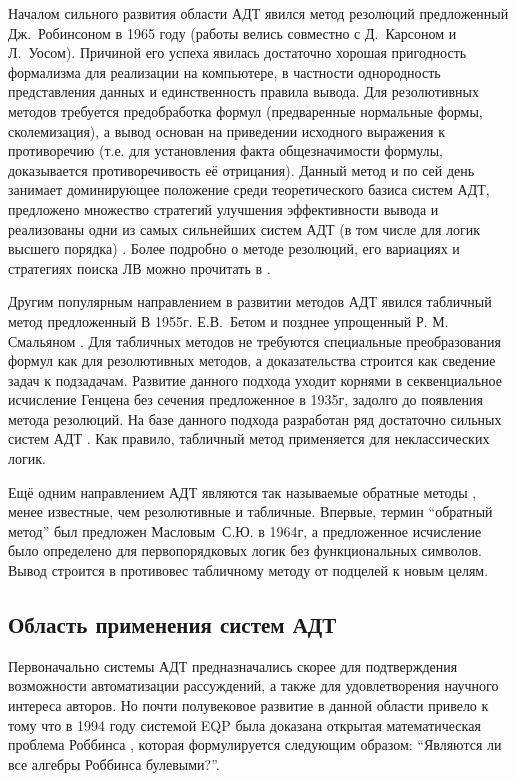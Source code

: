 Началом сильного развития области АДТ явился метод резолюций \cite{Robinson_1965} предложенный Дж.~Робинсоном в 1965 году (работы велись совместно с Д.~Карсоном и Л.~Уосом). Причиной его успеха явилась достаточно хорошая пригодность формализма для реализации на компьютере, в частности однородность представления данных и единственность правила вывода. Для резолютивных методов требуется предобработка формул (предваренные нормальные формы, сколемизация), а вывод основан на приведении исходного выражения к противоречию (т.е. для установления факта общезначимости формулы, доказывается противоречивость её отрицания). Данный метод и по сей день занимает доминирующее положение среди теоретического базиса систем АДТ, предложено множество стратегий улучшения эффективности вывода и реализованы одни из самых сильнейших систем АДТ (в том числе для логик высшего порядка) \cite{otter, vprover, eprover, iprover, leoprover}. Более подробно о методе резолюций, его вариациях и стратегиях поиска ЛВ можно прочитать в \cite{HAR, ChenLi}.

Другим популярным направлением в развитии методов АДТ явился табличный метод \cite{tableau2} предложенный В 1955г. Е.В.~Бетом \cite{Beth1955} и позднее упрощенный Р. М. Смальяном \cite{Smullyan1995}. Для табличных методов не требуются специальные преобразования формул как для резолютивных методов, а доказательства строится как сведение задач к подзадачам.  Развитие данного подхода уходит корнями в секвенциальное исчисление Генцена без сечения \cite{gentzen1935} предложенное в 1935г, задолго до появления метода резолюций. На базе данного подхода разработан ряд достаточно сильных систем АДТ \cite{isabelle, leancop}. Как правило, табличный метод применяется для неклассических логик.

Ещё одним направлением АДТ являются так называемые обратные методы \cite{inverse}, менее известные, чем резолютивные и табличные. Впервые, термин ``обратный метод'' был предложен Масловым~С.Ю. \cite{Maslov_1964} в 1964г, а предложенное исчисление было определено для первопорядковых логик без функциональных символов. Вывод строится в противовес табличному методу от подцелей к новым целям.


\subsection{Область применения систем АДТ}
Первоначально системы АДТ предназначались скорее для подтверждения возможности автоматизации рассуждений, а также для удовлетворения научного интереса авторов. Но почти полувековое развитие в данной области привело к тому что в 1994 году системой EQP была доказана открытая математическая проблема Роббинса \cite{McCuneRob}, которая формулируется следующим образом: ``Являются ли все алгебры Роббинса булевыми?''.

